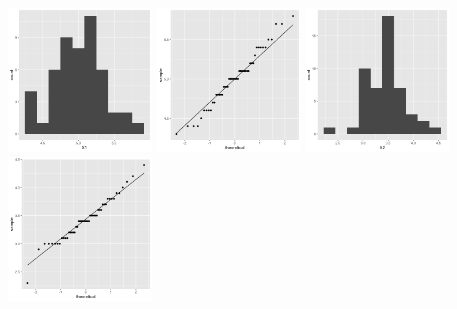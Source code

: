 \begin{center}
	\includegraphics[width=1.5in]{I_1_X1_hist.png}
	\includegraphics[width=1.5in]{I_1_X1_qq.png}
	\includegraphics[width=1.5in]{I_1_X2_hist.png}
	\includegraphics[width=1.5in]{I_1_X2_qq.png}
\end{center}
